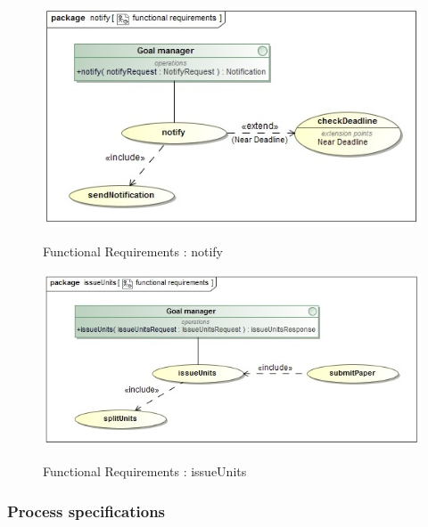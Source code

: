 \documentclass{article}
\begin{document}
		\begin{figure}[H]
			\includegraphics[width=\textwidth]{Ruan_Diagrams/notify_functionalRequirements.jpg}  \\
			\caption{Functional Requirements : notify}
		\end{figure}
		\begin{figure}[H]
			\includegraphics[width=\textwidth]{Ruan_Diagrams/issueUnits_functionalRequirements.jpg}  \\
			\caption{Functional Requirements : issueUnits}
		\end{figure}
	
	\subsubsection{Process specifications}
	
\end{document}
